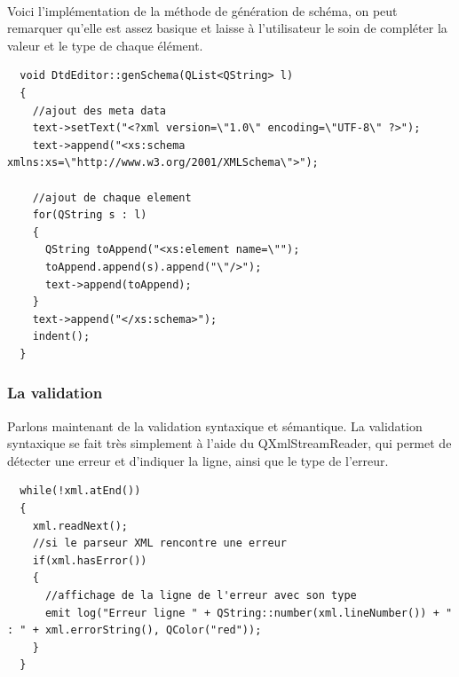 \paragraph{}
Voici l'implémentation de la méthode de génération de schéma, on peut remarquer qu'elle est assez basique et laisse à l'utilisateur le soin de compléter la valeur et le type de chaque élément.
\begin{lstlisting}
  void DtdEditor::genSchema(QList<QString> l)
  {
    //ajout des meta data
    text->setText("<?xml version=\"1.0\" encoding=\"UTF-8\" ?>");
    text->append("<xs:schema xmlns:xs=\"http://www.w3.org/2001/XMLSchema\">");

    //ajout de chaque element
    for(QString s : l)
    {
      QString toAppend("<xs:element name=\"");
      toAppend.append(s).append("\"/>");
      text->append(toAppend);
    }
    text->append("</xs:schema>");
    indent();
  }

\end{lstlisting}
\paragraph{}
\subsubsection{La validation}
Parlons maintenant de la validation syntaxique et sémantique. La validation syntaxique se fait très simplement à l'aide du QXmlStreamReader, qui permet de détecter une erreur et d'indiquer la ligne, ainsi que le type de l'erreur.

\begin{lstlisting}
  while(!xml.atEnd())
  {
    xml.readNext();
    //si le parseur XML rencontre une erreur
    if(xml.hasError())
    {
      //affichage de la ligne de l'erreur avec son type
      emit log("Erreur ligne " + QString::number(xml.lineNumber()) + " : " + xml.errorString(), QColor("red"));
    }
  }
\end{lstlisting}
